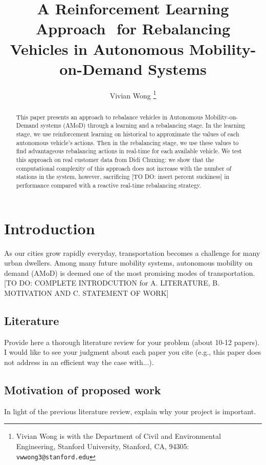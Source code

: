 \documentclass[letterpaper, 10 pt, conference]{ieeeconf}  %
\title{\LARGE \bf
A Reinforcement Learning Approach  for Rebalancing Vehicles in Autonomous Mobility-on-Demand Systems
}
\author{Vivian Wong%
\thanks{Vivian Wong is with the Department of Civil and Environmental Engineering, Stanford University, Stanford, CA, 94305:
        {\tt\small vwwong3@stanford.edu}}%
}
\begin{document}
\maketitle
\thispagestyle{empty}
\pagestyle{empty}


\begin{abstract}

This paper presents an approach to rebalance vehicles in Autonomous Mobility-on-Demand systems (AMoD) through a learning and a rebalancing stage. In the learning stage, we use reinforcement learning on historical to approximate the values of each autonomous vehicle's actions. Then in the rebalancing stage, we use these values to find advantageous rebalancing actions in real-time for each available vehicle. We test this approach on real customer data from Didi Chuxing: we show that the computational complexity of this approach does not increase with the number of stations in the system, however, sacrificing [TO DO: insert percent suckiness] in performance compared with a reactive real-time rebalancing strategy.  

\end{abstract}


\section{Introduction}

As our cities grow rapidly everyday, transportation becomes a challenge for many urban dwellers. Among many future mobility systems, autonomous mobility on demand (AMoD) is deemed one of the most promising modes of transportation. [TO DO: COMPLETE INTRODCUTION for A. LITERATURE, B. MOTIVATION AND C. STATEMENT OF WORK]

\subsection{Literature}

Provide here a thorough literature review for your problem (about 10-12 papers).  I would like to see your judgment about each paper you cite (e.g., this paper does not address in an efficient way the case with...).

\subsection{Motivation of proposed work} 
In light of the previous literature review, explain why your project is important.
\end{document}
